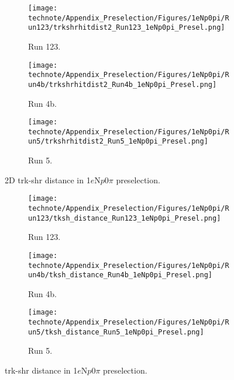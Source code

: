 \begin{figure}[H]
    \centering
    \begin{subfigure}[t]{0.32\linewidth}
        \texttt{[image: technote/Appendix\_Preselection/Figures/1eNp0pi/Run123/trkshrhitdist2\_Run123\_1eNp0pi\_Presel.png]}
        \caption{Run 123.}
    \end{subfigure}%
    \hspace{0.2cm}%
    \begin{subfigure}[t]{0.32\linewidth}
        \texttt{[image: technote/Appendix\_Preselection/Figures/1eNp0pi/Run4b/trkshrhitdist2\_Run4b\_1eNp0pi\_Presel.png]}
        \caption{Run 4b.}
    \end{subfigure}%
    \hspace{0.2cm}%
    \begin{subfigure}[t]{0.32\linewidth}
        \texttt{[image: technote/Appendix\_Preselection/Figures/1eNp0pi/Run5/trkshrhitdist2\_Run5\_1eNp0pi\_Presel.png]}
        \caption{Run 5.}
    \end{subfigure}
    \caption{2D trk-shr distance in 1$e$N$p$0$\pi$ preselection.}
\end{figure}

\begin{figure}[H]
    \centering
    \begin{subfigure}[t]{0.32\linewidth}
        \texttt{[image: technote/Appendix\_Preselection/Figures/1eNp0pi/Run123/tksh\_distance\_Run123\_1eNp0pi\_Presel.png]}
        \caption{Run 123.}
    \end{subfigure}%
    \hspace{0.2cm}%
    \begin{subfigure}[t]{0.32\linewidth}
        \texttt{[image: technote/Appendix\_Preselection/Figures/1eNp0pi/Run4b/tksh\_distance\_Run4b\_1eNp0pi\_Presel.png]}
        \caption{Run 4b.}
    \end{subfigure}%
    \hspace{0.2cm}%
    \begin{subfigure}[t]{0.32\linewidth}
        \texttt{[image: technote/Appendix\_Preselection/Figures/1eNp0pi/Run5/tksh\_distance\_Run5\_1eNp0pi\_Presel.png]}
        \caption{Run 5.}
    \end{subfigure}
    \caption{trk-shr distance in 1$e$N$p$0$\pi$ preselection.}
\end{figure}

